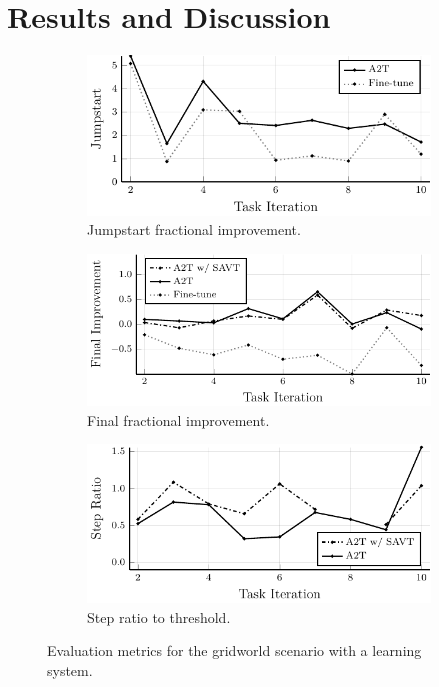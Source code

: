 \section{Results and Discussion}
\begin{figure}
    \centering
    \begin{subfigure}[b]{0.32\textwidth}
        \centering
        \includegraphics[width=\textwidth]{figures/iterative_validation/gridworld_learning/jumpstart.pdf}
        \caption{Jumpstart fractional improvement.}
        \label{fig:gwl_jumpstart}
    \end{subfigure}
    \hfill
    \begin{subfigure}[b]{0.32\textwidth}
        \centering
        \includegraphics[width=\textwidth]{figures/iterative_validation/gridworld_learning/peak_performance.pdf}
        \caption{Final fractional improvement.}
        \label{fig:gwl_final}
    \end{subfigure}
    \hfill
    \begin{subfigure}[b]{0.32\textwidth}
        \centering
        \includegraphics[width=\textwidth]{figures/iterative_validation/gridworld_learning/steps_to_threshold.pdf}
        \caption{Step ratio to threshold.}
        \label{fig:gwl_step}
    \end{subfigure}
    \caption{Evaluation metrics for the gridworld scenario with a learning system.}
    \label{fig:gwl}
\end{figure}




